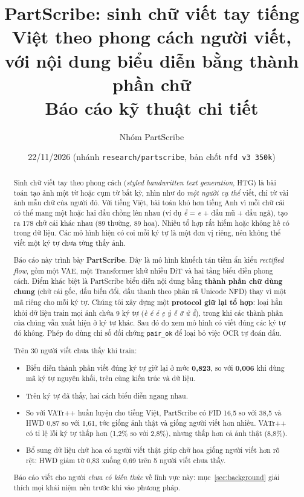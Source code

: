 \documentclass[11pt,a4paper]{article}
\title{\textbf{PartScribe: sinh chữ viết tay tiếng Việt theo phong cách người viết,\\ với nội dung biểu diễn bằng thành phần chữ}\\[4pt]
\large Báo cáo kỹ thuật chi tiết}
\author{Nhóm PartScribe}
\date{22/11/2026 \quad (nhánh \texttt{research/partscribe}, bản chốt \texttt{nfd v3 350k})}
\newcommand{\pairok}{\texttt{pair\_ok}}
\begin{document}
\maketitle

\begin{abstract}
Sinh chữ viết tay theo phong cách (\emph{styled handwritten text generation}, HTG) là bài toán tạo ảnh một từ hoặc cụm từ bất kỳ, nhìn như do \emph{một người cụ thể} viết, chỉ từ vài ảnh mẫu chữ của người đó. Với tiếng Việt, bài toán khó hơn tiếng Anh vì mỗi chữ cái có thể mang một hoặc hai dấu chồng lên nhau (ví dụ \emph{ễ} = \emph{e} + dấu mũ + dấu ngã), tạo ra 178 chữ cái khác nhau (89 thường, 89 hoa). Nhiều tổ hợp rất hiếm hoặc không hề có trong dữ liệu. Các mô hình hiện có coi mỗi ký tự là một đơn vị riêng, nên không thể viết một ký tự chưa từng thấy ảnh.

Báo cáo này trình bày \textbf{PartScribe}. Đây là mô hình khuếch tán tiềm ẩn kiểu \emph{rectified flow}, gồm một VAE, một Transformer khử nhiễu DiT và hai tầng biểu diễn phong cách. Điểm khác biệt là PartScribe biểu diễn nội dung bằng \textbf{thành phần chữ dùng chung} (chữ cái gốc, dấu biến đổi, dấu thanh theo phân rã Unicode NFD) thay vì một mã riêng cho mỗi ký tự. Chúng tôi xây dựng một \textbf{protocol giữ lại tổ hợp}: loại hẳn khỏi dữ liệu train mọi ảnh chứa 9 ký tự (\emph{è é ẻ ẹ ỷ ễ ỡ ử ẳ}), trong khi các thành phần của chúng vẫn xuất hiện ở ký tự khác. Sau đó đo xem mô hình có viết đúng các ký tự đó không. Phép đo dùng chỉ số đối chứng \pairok{} để loại bỏ việc OCR tự đoán dấu.

Trên 30 người viết chưa thấy khi train:
\begin{itemize}
\item Biểu diễn thành phần viết đúng ký tự giữ lại ở mức \textbf{0,823}, so với \textbf{0,006} khi dùng mã ký tự nguyên khối, trên cùng kiến trúc và dữ liệu.
\item Trên ký tự đã thấy, hai cách biểu diễn ngang nhau.
\item So với VATr++ huấn luyện cho tiếng Việt, PartScribe có FID 16,5 so với 38,5 và HWD 0,87 so với 1,61, tức giống ảnh thật và giống người viết hơn nhiều. VATr++ có tỉ lệ lỗi ký tự thấp hơn (1,2\% so với 2,8\%), nhưng thấp hơn cả ảnh thật (8,8\%).
\item Bổ sung dữ liệu chữ hoa có người viết thật giúp chữ hoa giống người viết hơn rõ rệt: HWD giảm từ 0,83 xuống 0,69 trên 5 người viết chưa thấy.
\end{itemize}
Báo cáo viết cho người \emph{chưa có kiến thức} về lĩnh vực này: mục~\ref{sec:background} giải thích mọi khái niệm nền trước khi vào phương pháp.
\end{abstract}
\end{document}
